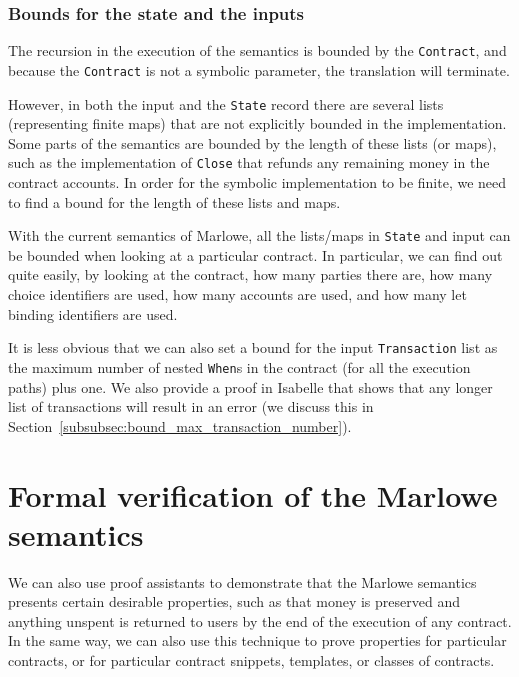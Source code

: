 \documentclass[runningheads]{llncs}
\begin{document}
\subsubsection{Bounds for the state and the inputs}

The recursion in the execution of the semantics is bounded by the \texttt{Contract}, and because the \texttt{Contract} is not a symbolic parameter, the translation will terminate.

However, in both the input and the \texttt{State} record there are several lists (representing finite maps) that are not explicitly bounded in the implementation. Some parts of the semantics are bounded by the length of these lists (or maps), such as the implementation of \texttt{Close} that refunds any remaining money in the contract accounts.
In order for the symbolic implementation to be finite, we need to find a bound for the length of these lists and maps.

With the current semantics of Marlowe, all the lists/maps in \texttt{State} and input can be bounded when looking at a particular contract. In particular, we can find out quite easily, by looking at the contract, how many parties there are, how many choice identifiers are used, how many accounts are used, and how many let binding identifiers are used.

It is less obvious that we can also set a bound for the input \texttt{Transaction} list as the maximum number of nested \texttt{When}s in the contract (for all the execution paths) plus one. We also provide a proof in Isabelle that shows that any longer list of transactions will result in an error (we discuss this in Section~\ref{subsubsec:bound_max_transaction_number}).

\section{Formal verification of the Marlowe semantics\label{sec:verification}}

We can also use proof assistants to demonstrate that the Marlowe semantics presents certain desirable properties, such as that money is preserved and anything unspent is returned to users by the end of the execution of any contract. In the same way, we can also use this technique to prove properties for particular contracts, or for particular contract snippets, templates, or classes of contracts.
\end{document}
